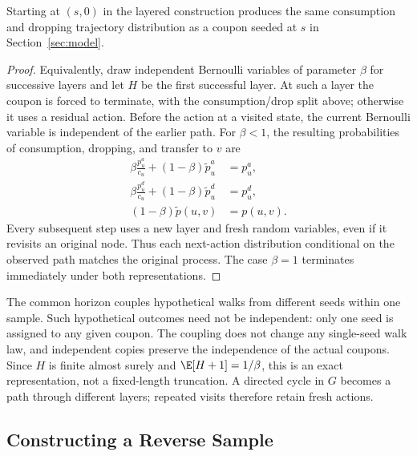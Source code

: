 \begin{lemma}
\label{lem:layered-law}
Starting at $(s,0)$ in the layered construction produces the same
consumption and dropping trajectory distribution as a coupon seeded
at $s$ in Section~\ref{sec:model}.
\end{lemma}

\begin{proof}
Equivalently, draw independent Bernoulli variables of parameter $\beta$
for successive layers and let $H$ be the first successful layer.
At such a layer the coupon is forced to terminate, with the
consumption/drop split above; otherwise it uses a residual action.
Before the action at a visited state, the current Bernoulli variable
is independent of the earlier path. For $\beta<1$, the resulting
probabilities of consumption, dropping, and transfer to $v$ are
\begin{align*}
  \beta\frac{p_u^a}{c_u}+(1-\beta)\widetilde p_u^a&=p_u^a,\\
  \beta\frac{p_u^d}{c_u}+(1-\beta)\widetilde p_u^d&=p_u^d,\\
  (1-\beta)\widetilde p(u,v)&=p(u,v).
\end{align*}
Every subsequent step uses a new layer and fresh random variables,
even if it revisits an original node. Thus each next-action distribution
conditional on the observed path matches the original process. The
case $\beta=1$ terminates immediately under both representations.
\end{proof}

The common horizon couples hypothetical walks from different seeds
within one sample. Such hypothetical outcomes need not be independent:
only one seed is assigned to any given coupon. The coupling does not
change any single-seed walk law, and independent copies preserve the
independence of the actual coupons. Since $H$ is finite almost surely
and $\E[H+1]=1/\beta$, this is an exact representation, not a
fixed-length truncation. A directed cycle in $G$ becomes a path through
different layers; repeated visits therefore retain fresh actions.

\subsection{Constructing a Reverse Sample}
\label{sec:reverse-construction}

